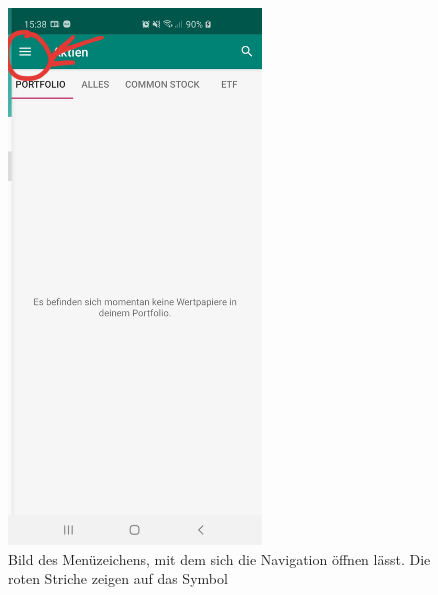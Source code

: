 \documentclass[10pt]{scrartcl}
\begin{document}
\begin{figure}[H]
	\centering
	\includegraphics[width=0.6\textwidth]{Bilder/Applikation/NavigationsSymbol.jpg}
	\caption{Bild des Menüzeichens, mit dem sich die Navigation öffnen lässt. Die roten Striche zeigen auf das Symbol}
\end{figure}
\end{document}
